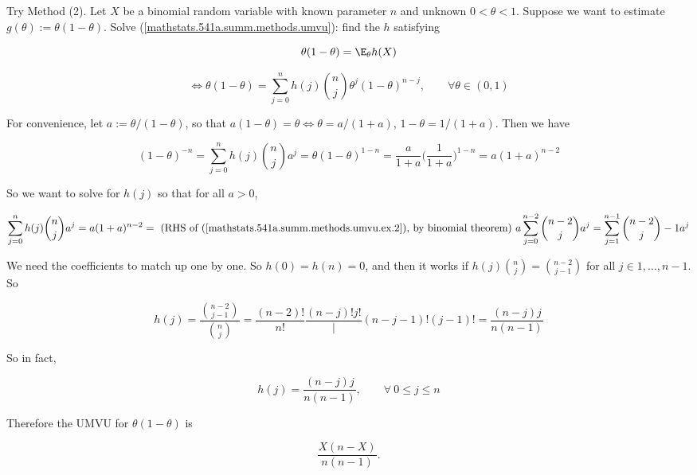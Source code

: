 \begin{example} Try Method (2). Let \(X\) be a binomial random variable with known parameter \(n\) and unknown \(0 < \theta < 1\). Suppose we want to estimate \(g(\theta) := \theta(1-\theta)\). Solve (\ref{mathstats.541a.summ.methods.umvu}): find the \(h\) satisfying

\[
\theta(1 -\theta) = \E_\theta h(X) 
\]

\[
\iff \theta(1 -\theta) =  \sum_{j=0}^n h(j) \binom{n}{j} \theta^j(1 - \theta)^{n-j}, \qquad \forall \theta \in (0,1)
\]

For convenience, let \(a:= \theta/(1-\theta)\), so that \(a(1-\theta) = \theta \iff \theta = a/(1+a)\), \(1 - \theta = 1/(1+a)\). Then we have

 \begin{equation}\label{mathstats.541a.summ.methods.umvu.ex.2}
(1 - \theta)^{-n} = \sum_{j=0}^n h(j) \binom{n}{j} a^j =  \theta(1 -\theta)^{1-n} = \frac{a}{1+a} \bigg( \frac{1}{1+a} \bigg)^{1-n} = a(1+a)^{n-2}
\end{equation}

So we want to solve for \(h(j)\) so that for all \(a > 0\),

\[
 \sum_{j=0}^n h(j) \binom{n}{j} a^j =a(1+a)^{n-2} = \text{ (RHS of (\ref{mathstats.541a.summ.methods.umvu.ex.2}), by binomial theorem) }  a \sum_{j=0}^{n-2} \binom{n-2}{j} a^j = \sum_{j=1}^{n-1} \binom{n-2}{j}-1 a^j 
\]

We need the coefficients to match up one by one. So \(h(0) = h(n) = 0\), and then it works if \(h(j)\binom{n}{j} = \binom{n-2}{j-1}\) for all \(j \in 1, \ldots, n-1\). So

\[
h(j) = \frac{\binom{n-2}{j-1}}{\binom{n}{j}} = \frac{(n-2)!}{n!} \frac{(n-j)! j!}|{(n-j-1)!(j-1)!} = \frac{(n-j)j }{n(n-1)}
\]

So in fact, 

\[
h(j) = \frac{(n-j)j}{n(n-1)}, \qquad \forall \ 0 \leq j \leq n
\]

Therefore the UMVU for \(\theta(1-\theta)\) is 

\[
\frac{X(n-X)}{n(n-1)}.
\]

\end{example}

